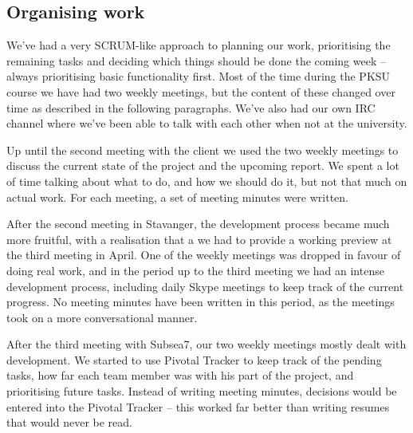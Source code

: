 \subsection{Organising work}

We've had a very SCRUM-like approach to planning our work,
prioritising the remaining tasks and deciding which things should be
done the coming week -- always prioritising basic functionality
first. Most of the time during the PKSU course we have had two weekly
meetings, but the content of these changed over time as described in the following paragraphs. We've also had our own IRC channel where we've been able to
talk with each other when not at the university.

Up until the second meeting with the client we used the two weekly
meetings to discuss the current state of the project and the upcoming
report. We spent a lot of time talking about what to do, and how we
should do it, but not that much on actual work. For each meeting, a
set of meeting minutes were written.

After the second meeting in Stavanger, the development process became
much more fruitful, with a realisation that a we had to provide a
working preview at the third meeting in April. One of the weekly
meetings was dropped in favour of doing real work, and in the period
up to the third meeting we had an intense development process,
including daily Skype meetings to keep track of the current
progress. No meeting minutes have been written in this period, as the
meetings took on a more conversational manner.

After the third meeting with Subsea7, our two weekly meetings mostly
dealt with development. We started to use Pivotal Tracker to keep
track of the pending tasks, how far each team member was with his part
of the project, and prioritising future tasks. Instead of writing
meeting minutes, decisions would be entered into the Pivotal Tracker
-- this worked far better than writing resumes that would never be
read.
